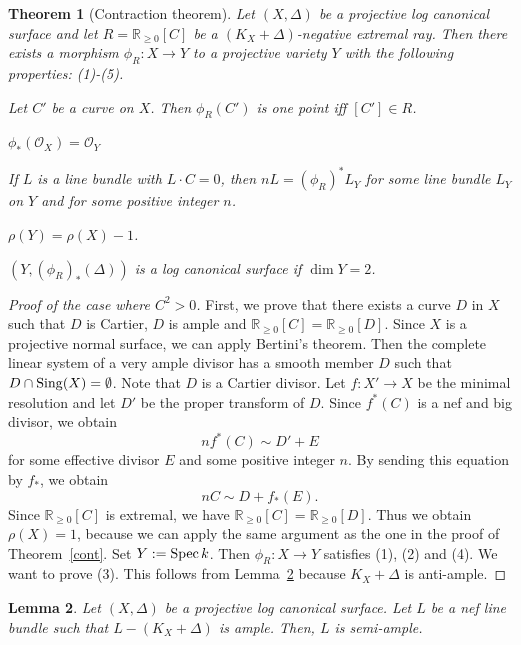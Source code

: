 \documentclass[12pt,twoside]{amsart}
\newtheorem{thm}{Theorem}[section]
\newtheorem{lem}[thm]{Lemma}
\theoremstyle{definition}
\begin{document}
\begin{thm}[Contraction theorem]\label{lccont}
Let $(X, \Delta)$ be a projective log canonical surface and 
let $R=\mathbb{R}_{\geq 0}[C]$ be a $(K_X+\Delta)$-negative extremal ray. 
Then there exists a morphism $\phi_R: X \to Y$ 
to a projective variety $Y$ with the following properties{\em{:}} {\em{(1)-(5)}}.
\begin{enumerate}
\item{Let $C'$ be a curve on $X$. 
Then $\phi_R(C')$ is one point iff $[C'] \in R$.}
\item{$\phi_*(\mathcal{O}_X)=\mathcal{O}_Y$
\item{If $L$ is a line bundle with $L\cdot C=0$, 
then $nL=(\phi_R)^*L_Y$ for some line bundle $L_Y$ on $Y$ and 
for some positive integer $n$.}
\item{$\rho(Y)=\rho(X)-1$.}
\item{$(Y, (\phi_R)_*(\Delta))$ is a log canonical surface if $\dim Y=2$.}}
\end{enumerate}
\end{thm}

\begin{proof}[Proof of the case where $C^2>0$]
First, we prove that there exists a curve $D$ in $X$ 
such that 
$D$ is Cartier, $D$ is ample and $\mathbb{R}_{\geq 0}[C]=\mathbb{R}_{\geq 0}[D]$. 
Since $X$ is a projective normal surface, 
we can apply Bertini's theorem. 
Then the complete linear system of a very ample divisor has 
a smooth member $D$ 
such that $D \cap {\rm Sing}(X)=\emptyset$. 
Note that $D$ is a Cartier divisor. 
Let $f:X' \to X$ be the minimal resolution and 
let $D'$ be the proper transform of $D$. 
Since $f^*(C)$ is a nef and big divisor, 
we obtain 
$$nf^*(C)\sim D'+E$$
for some effective divisor $E$ and some positive integer $n$. 
By sending this equation by $f_*$, we obtain 
$$nC\sim D+f_*(E).$$
Since $\mathbb{R}_{\geq 0}[C]$ is extremal, 
we have $\mathbb{R}_{\geq 0}[C]=\mathbb{R}_{\geq 0}[D]$. 
Thus we obtain $\rho(X)=1$, 
because we can apply the same argument 
as the one in the proof of Theorem~\ref{cont}. 
Set $Y:={\rm Spec}\,k$. 
Then $\phi_R: X \to Y$ satisfies (1), (2) and (4).
We want to prove (3).
This follows from Lemma~\ref{lcabundancelemma} 
because $K_X+\Delta$ is anti-ample. 
\end{proof}

\begin{lem}\label{lcabundancelemma}
Let $(X, \Delta)$ be a projective log canonical surface. 
Let $L$ be a nef line bundle such that $L-(K_X+\Delta)$ is ample.
Then, $L$ is semi-ample.
\end{lem}
\end{document}
